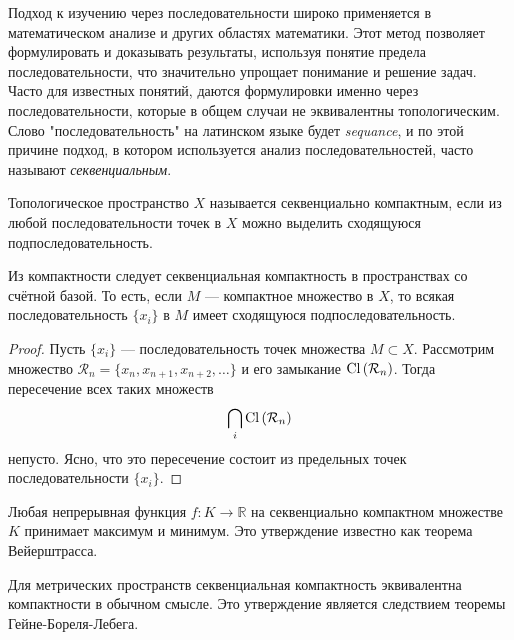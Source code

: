 Подход к изучению через последовательности широко применяется в математическом анализе и других областях математики. Этот метод позволяет формулировать и доказывать результаты, используя понятие предела последовательности, что значительно упрощает понимание и решение задач. Часто для известных понятий, даются формулировки именно через последовательности, которые в общем случаи не эквивалентны топологическим. 
Слово "последовательность" на латинском языке будет \textit{sequance}, и по этой причине подход, в котором используется анализ последовательностей, часто называют \textit{секвенциальным}.

\begin{definition}
	Топологическое пространство \(X\) называется секвенциально компактным, если из любой последовательности точек в \(X\) можно выделить сходящуюся подпоследовательность.
\end{definition}


\begin{statement}
	Из компактности следует секвенциальная компактность в пространствах со счётной базой. То есть, если \( M \) — компактное множество в \( X \), то всякая последовательность \( \{x_i\} \) в \( M \) имеет сходящуюся подпоследовательность.
\end{statement}

\begin{proof}
	Пусть \( \{x_i\} \) — последовательность точек множества \( M \subset X \). Рассмотрим множество \( \mathcal{R}_n = \{ x_n, x_{n+1}, x_{n+2}, \dots \} \) и его замыкание \( \mathrm{Cl}\left(\mathcal{R}_n\right) \). Тогда пересечение всех таких множеств
	\[
		\bigcap_{i} \mathrm{Cl}\left(\mathcal{R}_n\right)
	\]
	непусто. Ясно, что это пересечение состоит из предельных точек последовательности \( \{ x_i \} \).
\end{proof}

\begin{remark}
    Любая непрерывная функция \( f : K \to \mathbb{R} \) на секвенциально компактном множестве \( K \) принимает максимум и минимум. Это утверждение известно как теорема Вейерштрасса.
\end{remark}

\begin{remark}
    Для метрических пространств секвенциальная компактность эквивалентна компактности в обычном смысле. Это утверждение является следствием теоремы Гейне-Бореля-Лебега.
\end{remark}


